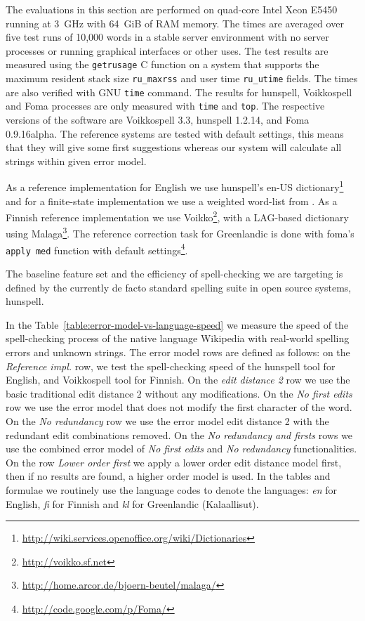 \documentclass[11pt]{article}
\begin{document}
The evaluations in this section are performed on quad-core Intel Xeon E5450
running at 3~GHz with 64~GiB of RAM memory. The times are averaged over five
test runs of 10,000 words in a stable server environment with no server processes
or running graphical interfaces or other uses. The test results are measured using the
\texttt{getrusage} C function on a system that supports the maximum resident
stack size \texttt{ru\_maxrss} and user time \texttt{ru\_utime} fields. The
times are also verified with GNU \texttt{time} command. The results for
hunspell, Voikkospell and Foma processes are only measured with \texttt{time} and \texttt{top}.
The respective versions of the software are Voikkospell 3.3, hunspell
1.2.14, and Foma 0.9.16alpha. The reference systems are tested with default
settings, this means that they will give some first suggestions whereas
our system will calculate all strings within given error model.

As a reference implementation for English we use hunspell's en-US
dictionary\footnote{\url{http://wiki.services.openoffice.org/wiki/Dictionaries}}
and for a finite-state implementation we use a weighted word-list from
. As a Finnish reference implementation we use
Voikko\footnote{\url{http://voikko.sf.net}},
with a LAG-based dictionary using
Malaga\footnote{\url{http://home.arcor.de/bjoern-beutel/malaga/}}. The
reference correction task for Greenlandic is done with foma's~\cite{foma}
\texttt{apply med} function with default
settings\footnote{\url{http://code.google.com/p/Foma/}}.  

The baseline feature set and the efficiency of spell-checking we are targeting
is defined by the currently de facto standard spelling suite in open source
systems, hunspell.

In the Table~\ref{table:error-model-vs-language-speed} we measure the speed of
the spell-checking process of the native language Wikipedia with real-world
spelling errors and unknown strings. The error model rows are defined as
follows: on the \emph{Reference impl.} row, we test the spell-checking speed of
the hunspell tool for English, and Voikkospell tool for Finnish. On the
\emph{edit distance 2} row we use the basic traditional edit distance 2 without
any modifications. On the \emph{No first edits} row we
use the error model that does not modify the first character of the word.
On the \emph{No redundancy}
row we use the error model edit distance 2 with the redundant edit combinations
removed. On the \emph{No redundancy and firsts} rows we use the combined
error model of \emph{No first edits} and \emph{No redundancy}
functionalities.  On the row \emph{Lower order first} we apply a
lower order edit distance model first, then if no results are found,
a higher order model is used. In the tables and formulae we routinely use the language
codes to denote the languages: \emph{en} for English, \emph{fi} for Finnish and
\emph{kl} for Greenlandic (Kalaallisut). 
\end{document}
